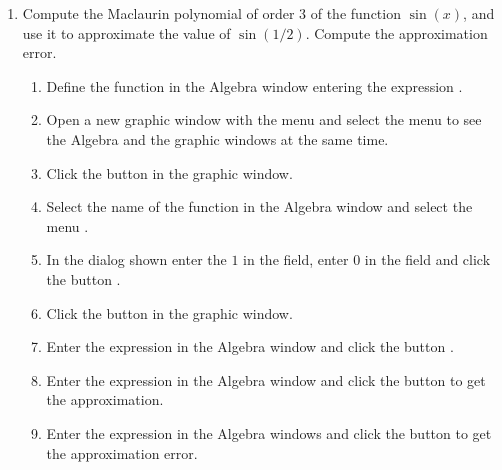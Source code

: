 \begin{enumerate}[leftmargin=*]
\item Compute the Maclaurin polynomial of order 3 of the function $\sin(x)$, and use it to approximate the value of $\sin(1/2)$.
Compute the approximation error.

\begin{indication}
\begin{enumerate}
\item Define the function in the Algebra window entering the expression .
\item Open a new graphic window with the menu  and select the menu  to see the Algebra and the graphic windows at the same time.
\item Click the button  in the graphic window.
\item Select the name of the function in the Algebra window and select the menu .
\item In the dialog shown enter the $1$ in the  field, enter 0 in the  field and click the button .
\item Click the button  in the graphic window. 
\item Enter the expression  in the Algebra window and click the button .
\item Enter the expression  in the Algebra window and click the button  to get the approximation.
\item Enter the expression  in the Algebra windows and click the button  to get the approximation error.
\end{enumerate}
\end{indication}
% 

\end{enumerate}
